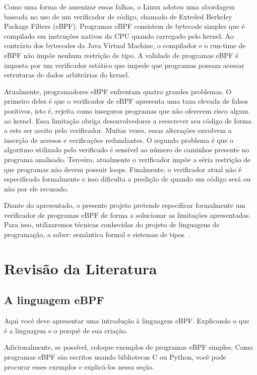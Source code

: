 \documentclass[paper=a4, fontsize=12pt]{article}
\theoremstyle{definition}
\begin{document}
Como uma forma de amenizar essas falhas, o Linux adotou uma abordagem baseada no uso de um
verificador de código, chamado de Exteded Berkeley Package Filters (eBPF). Programas eBPF
consistem de bytecode simples que é compilado em instruções nativas da CPU quando carregado pelo
kernel. Ao contrário dos bytecodes da Java Virtual Machine, o compilador e o run-time de eBPF
não impõe nenhum restrição de tipo. A validade de programas eBPF é imposta por um
verificador estático que impede que programas possam acessar estruturas de dados arbitrárias
do kernel.

Atualmente, programadores eBPF enfrentam quatro grandes problemas. O primeiro deles é que
o verificador de eBPF apresenta uma taxa elevada de falsos positivos, isto é, rejeita como
inseguros programas que não oferecem risco algum ao kernel. Essa limitação obriga desenvolvedores
a reescrever seu código de forma a este ser aceito pelo verificador. Muitas vezes, essas
alterações envolvem a inserção de acessos e verificações redundantes. O segundo problema é que
o algoritmo utilizado pelo verificado é sensível ao número de caminhos presente no programa analisado.
Terceiro, atualmente o verificador impõe a séria restrição de que programas não devem possuir loops.
Finalmente, o verificador atual não é especificado formalmente e isso dificulta a predição de quando
um código será ou não por ele recusado.

Diante do apresentado, o presente projeto pretende especificar formalmente um verificador de
programas eBPF de forma a solucionar as limitações apresentadas. Para isso, utilizaremos técnicas
conhecidas do projeto de linguagens de programação, a saber: semântica formal e
sistemas de tipos~\cite{Pierce02,Klein12,Chang17}.


\section{Revisão da Literatura}

\subsection{A linguagem eBPF}

Aqui você deve apresentar uma introdução à linguagem eBPF.
Explicando o que é a linguagem e o porquê de sua criação.

Adicionalmente, se possível, coloque
exemplos de programas eBPF simples. Como programas eBPF são escritos usando bibliotecas C
ou Python, você pode procurar esses exemplos e explicá-los nessa seção.
\end{document}
